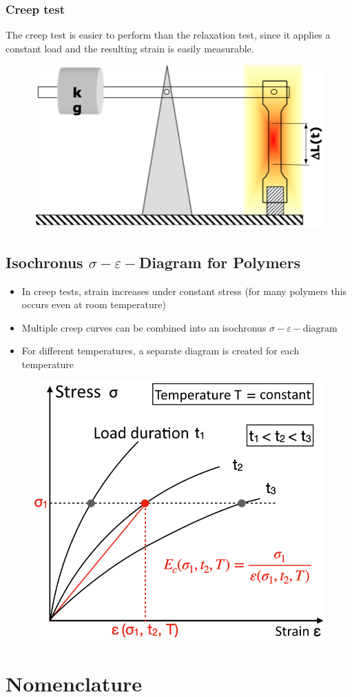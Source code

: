 \documentclass{article}
\begin{document}
\subsubsection{Creep test}
The creep test is easier to perform than the relaxation test, since it applies a constant
load and the resulting strain is easily measurable.
\begin{figure}[ht!]
  \centering
  \includegraphics[width=.5\textwidth]{media/creep-test.png}
\end{figure}

\subsection{Isochronus $\sigma-\varepsilon-$Diagram for Polymers}
\begin{itemize}
  \item In creep tests, strain increases under constant stress (for many polymers this occurs even at room temperature)
  \item Multiple creep curves can be combined into an isochronus $\sigma-\varepsilon-$diagram
  \item For different temperatures, a separate diagram is created for each temperature
\end{itemize}

\begin{figure}[ht!]
  \centering
  \includegraphics[width=.45\textwidth]{media/isochronus-diagram.png}
\end{figure}













\newpage
\appendix
\printacronyms[name=Glossary, heading=section]
\newpage

\section{Nomenclature}
\vspace*{-1cm}
\printnomenclature
\end{document}
